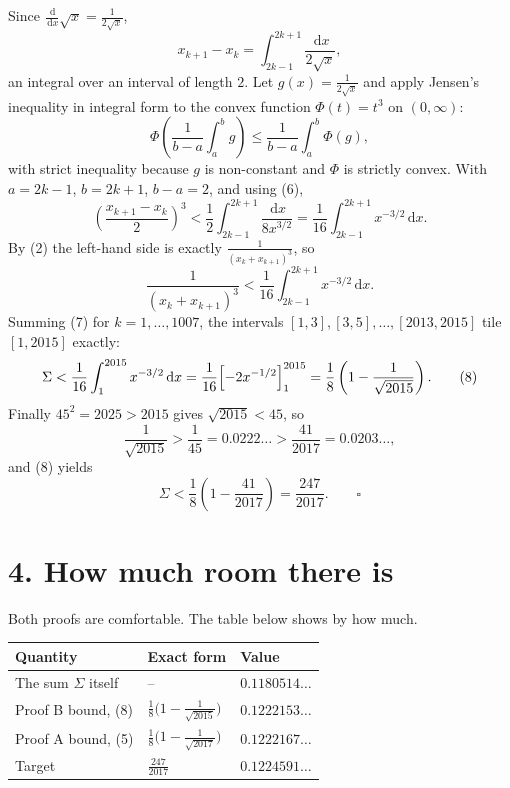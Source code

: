 \documentclass[12pt]{article}
\newcommand{\dd}{\,\mathrm{d}}
\newcommand{\xk}{x_k}
\newcommand{\xkp}{x_{k+1}}
\begin{document}
Since \(\frac{\dd}{\dd x}\sqrt x=\frac1{2\sqrt x}\),
\[
\xkp-\xk=\int_{2k-1}^{2k+1}\frac{\dd x}{2\sqrt x},
\tag{6}
\]
an integral over an interval of length \(2\). Let
\(g(x)=\frac1{2\sqrt x}\) and apply Jensen's inequality in integral form
to the convex function \(\Phi(t)=t^3\) on \((0,\infty)\):
\[
\Phi\!\left(\frac1{b-a}\int_a^b g\right)\le\frac1{b-a}\int_a^b\Phi(g),
\]
with strict inequality because \(g\) is non-constant and \(\Phi\) is
strictly convex. With \(a=2k-1\), \(b=2k+1\), \(b-a=2\), and using (6),
\[
\left(\frac{\xkp-\xk}{2}\right)^3
<\frac12\int_{2k-1}^{2k+1}\frac{\dd x}{8x^{3/2}}
=\frac1{16}\int_{2k-1}^{2k+1}x^{-3/2}\dd x .
\]
By (2) the left-hand side is exactly \(\frac1{(\xk+\xkp)^3}\), so
\[
\boxed{\displaystyle
\frac1{(\xk+\xkp)^3}<\frac1{16}\int_{2k-1}^{2k+1}x^{-3/2}\dd x .}
\tag{7}
\]
Summing (7) for \(k=1,\dots,1007\), the intervals
\([1,3],[3,5],\dots,[2013,2015]\) tile \([1,2015]\) exactly:
\[
\Sigma<\frac1{16}\int_1^{2015}x^{-3/2}\dd x
=\frac1{16}\Bigl[-2x^{-1/2}\Bigr]_1^{2015}
=\frac18\left(1-\frac1{\sqrt{2015}}\right).
\tag{8}
\]
Finally \(45^2=2025>2015\) gives \(\sqrt{2015}<45\), so
\[
\frac1{\sqrt{2015}}>\frac1{45}=0.0222\ldots>\frac{41}{2017}=0.0203\ldots,
\]
and (8) yields
\[
\Sigma<\frac18\left(1-\frac{41}{2017}\right)=\frac{247}{2017}. \qquad\square
\]

\section*{4. How much room there is}

Both proofs are comfortable. The table below shows by how much.

\begin{center}
\small
\renewcommand{\arraystretch}{1.4}
\begin{tabularx}{\textwidth}{@{}>{\raggedright\arraybackslash}p{}XX@{}}
\toprule
Quantity & Exact form & Value \\
\midrule
The sum \(\Sigma\) itself
& --
& \(0.1180514\ldots\) \\
Proof B bound, (8)
& \(\frac18\bigl(1-\tfrac1{\sqrt{2015}}\bigr)\)
& \(0.1222153\ldots\) \\
Proof A bound, (5)
& \(\frac18\bigl(1-\tfrac1{\sqrt{2017}}\bigr)\)
& \(0.1222167\ldots\) \\
Target
& \(\frac{247}{2017}\)
& \(0.1224591\ldots\) \\
\bottomrule
\end{tabularx}
\end{center}
\end{document}
